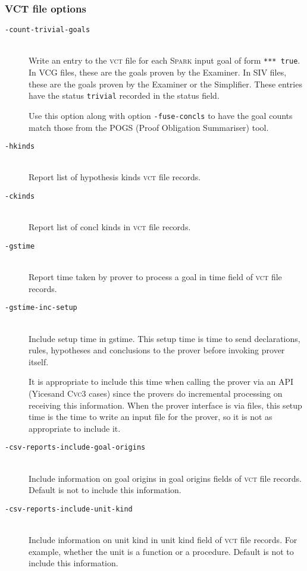 \documentclass[12pt,fleqn]{article}
\newcommand{\spark}{\textsc{Spark}}
\newcommand{\cvcthree}{\textsc{Cvc}3}
\newcommand{\yices}{Yices}
\newcommand{\goalreportfile}{\textsc{vct}}
\newcommand{\optionb}[1]{\item[\texttt{-{#1}}]\ \\}
\begin{document}
\subsubsection{VCT file options}


\begin{description}

\optionb{count-trivial-goals}

   Write an entry to the \goalreportfile{} file for each \spark{} input goal 
   of form \texttt{*** true}.
   In VCG files, these are the goals proven by the Examiner.
   In SIV files, these are the goals proven by the Examiner or the 
   Simplifier.
   These entries have the status \texttt{trivial} recorded in the status field.

   Use this option along with option \texttt{-fuse-concls} to have the
   goal counts match those from the POGS (Proof Obligation Summariser)
   tool.

\optionb{hkinds} Report list of hypothesis kinds \goalreportfile{} file records.
\optionb{ckinds} Report list of concl kinds in \goalreportfile{} file records.
\optionb{gstime} 
  Report time taken by prover to process a goal 
       in time field of \goalreportfile{} file records.
\optionb{gstime-inc-setup}
  Include setup time in gstime.  This setup time is time to 
  send declarations, rules, hypotheses and conclusions to the prover before
  invoking prover itself.  

  It is appropriate to include this time when calling the prover via 
  an API (\yices and \cvcthree{} cases) since
  the provers do incremental processing on receiving this information.
  When the prover interface is via files, this setup time is the time to 
  write an input file for the prover, so it is not as appropriate to include
  it.

\optionb{csv-reports-include-goal-origins}
  Include information on goal origins in goal origins fields of 
  \goalreportfile{} file records.
  Default is not to include this information.

\optionb{csv-reports-include-unit-kind}
  Include information on unit kind in unit kind field of \goalreportfile{} file
  records.  For example, whether the unit is a function or a procedure.
  Default is not to include this information.
\end{description}

\end{document}
